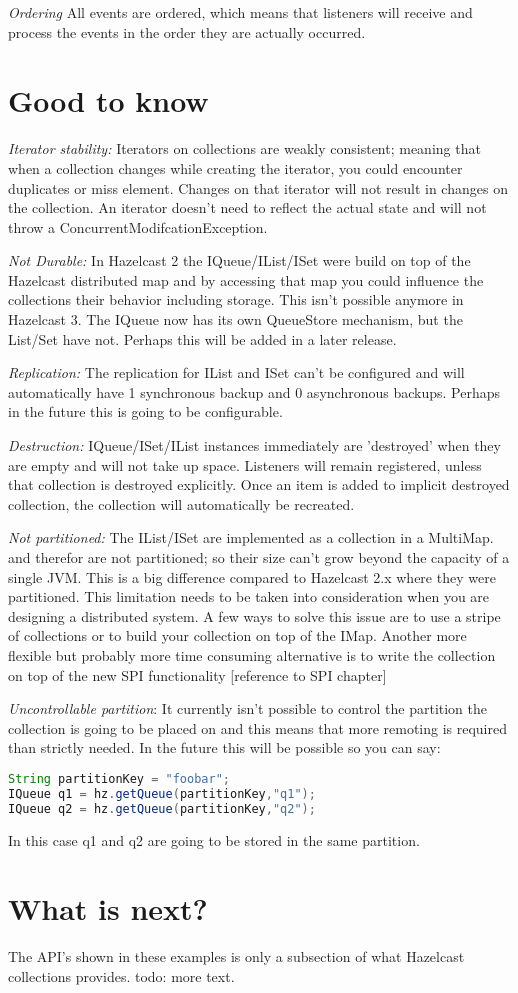 \emph{Ordering} All events are ordered, which means that listeners will receive and process the events in the order they are actually occurred. 

\section{Good to know}

\emph{Iterator stability:} Iterators on collections are weakly consistent; meaning that when a collection changes while creating the iterator, you could encounter duplicates or miss element. Changes on that iterator will not result in changes on the collection. An iterator doesn't need to reflect the actual state and will not throw a ConcurrentModifcationException. 

\emph{Not Durable:} In Hazelcast 2 the IQueue/IList/ISet were build on top of the Hazelcast distributed map and by accessing that map you could influence the collections their behavior including storage. This isn't possible anymore in Hazelcast 3. The IQueue now has its own QueueStore mechanism, but the List/Set have not. Perhaps this will be added in a later release.

\emph{Replication:} The replication for IList and ISet can't be configured and will automatically have 1 synchronous backup and 0 asynchronous backups. Perhaps in the future this is going to be configurable.

\emph{Destruction:} IQueue/ISet/IList instances immediately are 'destroyed' when they are empty and will not take up space. Listeners will remain registered, unless that collection is destroyed explicitly. Once an item is added to implicit destroyed collection, the collection will automatically be recreated.

\emph{Not partitioned:}  The IList/ISet are implemented as a collection in a MultiMap. and therefor are not partitioned; so their size can't grow beyond the capacity of a single JVM. This is a big difference compared to Hazelcast 2.x where they were partitioned. This limitation needs to be taken into consideration when you are designing a distributed system. A few ways to solve this issue are to use a stripe of collections or to build your collection on top of the IMap. Another more flexible but probably more time consuming alternative is to write the collection on top of the new SPI functionality [reference to SPI chapter]

\emph{Uncontrollable partition}: It currently isn't possible to control the partition the collection is going to be placed on and this means that more remoting is required than strictly needed. In the future this will be possible so you can say:
\begin{lstlisting}[language=java]
String partitionKey = "foobar";
IQueue q1 = hz.getQueue(partitionKey,"q1");
IQueue q2 = hz.getQueue(partitionKey,"q2");
\end{lstlisting}
In this case q1 and q2 are going to be stored in the same partition.

\section{What is next?}
The API's shown in these examples is only a subsection of what Hazelcast collections provides. todo: more text.